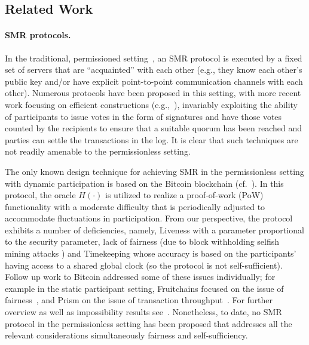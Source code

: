 \subsection{Related Work}
\label{subsec:related-work}

\paragraph{SMR protocols.}
%
In the traditional, permissioned setting~\cite{CSUR:Schneider90}, an SMR protocol is executed by a fixed set of servers that are ``acquainted'' with each other (e.g., they know each other's public key and/or have explicit point-to-point communication channels with each other).
%
Numerous protocols have been proposed in this setting, with more recent work focusing on efficient constructions (e.g.,~\cite{OSDI:CasLis99,PODC:YMRGA19,EC:ChaPasShi19,SP:AMNRY20,EUROSys:DKSS22}), invariably exploiting the ability of participants to issue votes in the form of signatures and have those votes counted by the recipients to ensure that a suitable quorum has been reached and parties can settle the transactions in the log.
%
It is clear that such techniques are not readily amenable to the permissionless setting.

The only known design technique for achieving SMR in the permissionless setting with dynamic participation is based on the Bitcoin blockchain (cf.~\cite{Nak08,C:GarKiaLeo17}).
%
In this protocol, the oracle $H(\cdot)$ is utilized to realize a proof-of-work (PoW) functionality \cite{C:DwoNao92} with a moderate difficulty that is periodically adjusted to accommodate fluctuations in participation.
%
From our perspective, the protocol exhibits a number of deficiencies, namely, Liveness with a parameter proportional to the security parameter, lack of fairness (due to block withholding selfish mining attacks \cite{FC:EyaSir14,EC:GarKiaLeo15}) and Timekeeping whose accuracy is based on the participants' having access to a shared global clock (so the protocol is not self-sufficient).
%
Follow up work to Bitcoin addressed some of these issues individually; for example in the static participant setting, Fruitchains focused on the issue of fairness~\cite{PODC:PasShi17}, and Prism on the issue of transaction throughput~\cite{CCS:BKTFV19}.
%
For further overview as well as impossibility results see~\cite{CSF:PasShi17,RSA:GarKia20}.
%
Nonetheless, to date, no SMR protocol in the permissionless setting has been proposed that addresses all the relevant considerations simultaneously fairness and self-sufficiency.

